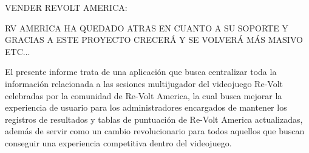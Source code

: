 VENDER REVOLT AMERICA:

RV AMERICA HA QUEDADO ATRAS EN CUANTO A SU SOPORTE Y GRACIAS A ESTE PROYECTO CRECERÁ Y SE VOLVERÁ MÁS MASIVO ETC...


El presente informe trata de una aplicación que busca centralizar toda la información relacionada a las sesiones multijugador del videojuego Re-Volt celebradas por la comunidad de Re-Volt America, la cual busca mejorar la experiencia de usuario para los administradores encargados de mantener los registros de resultados y tablas de puntuación de Re-Volt America actualizadas, además de servir como un cambio revolucionario para todos aquellos que buscan conseguir una experiencia competitiva dentro del videojuego. 
